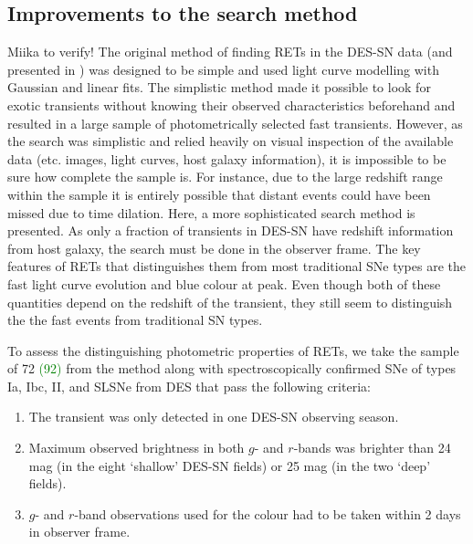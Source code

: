 \documentclass[fleqn,usenatbib,]{mnras}
\newcommand{\miika}[1]{\color{green}#1 \color{black}}
\begin{document}
\subsection{Improvements to the search method}

\miika{Miika to verify!}
The original method of finding RETs in the DES-SN data (and presented in ) was designed to be simple and used light curve modelling with Gaussian and linear fits. The simplistic method made it possible to look for exotic transients without knowing their observed characteristics beforehand and resulted in a large sample of photometrically selected fast transients. However, as the search was simplistic and relied heavily on visual inspection of the available data (etc. images, light curves, host galaxy information), it is impossible to be sure how complete the sample is. For instance, due to the large redshift range within the sample it is entirely possible that distant events could have been missed due to time dilation. Here, a more sophisticated search method is presented. As only a fraction of transients in DES-SN have redshift information from host galaxy, the search must be done in the observer frame.  The key features of RETs that distinguishes them from most traditional SNe types are the fast light curve evolution and blue colour at peak. Even though both of these quantities depend on the redshift of the transient, they still seem to distinguish the the fast events from traditional SN types. 

To assess the distinguishing photometric properties of RETs, we take the sample of 72 \textcolor{green}{(92)} from the  method along with spectroscopically confirmed SNe of types Ia, Ibc, II, and SLSNe from DES that pass the following criteria:
\begin{enumerate}
\item The transient was only detected in one DES-SN observing season.
\item Maximum observed brightness in both $g$- and $r$-bands was brighter than 24 mag (in the eight `shallow' DES-SN fields) or 25 mag (in the two `deep' fields).
\item $g$- and $r$-band observations used for the colour had to be taken within 2 days in observer frame.
\end{enumerate}
\end{document}
